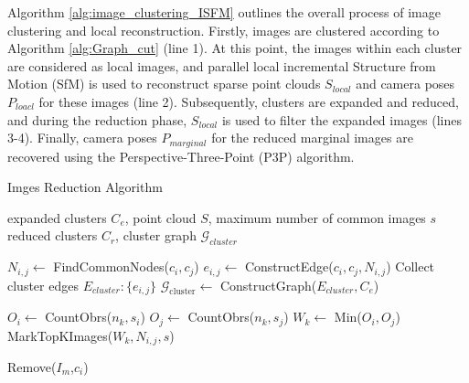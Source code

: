 \documentclass[runningheads]{llncs}
\begin{document}
Algorithm \ref{alg:image_clustering_ISFM} outlines the overall process of image clustering and local reconstruction. Firstly, images are clustered according to Algorithm \ref{alg:Graph_cut} (line 1). At this point, the images within each cluster are considered as local images, and parallel local incremental Structure from Motion (SfM) is used to reconstruct sparse point clouds $S_{local}$ and camera poses $P_{loacl}$ for these images (line 2). Subsequently, clusters are expanded and reduced, and during the reduction phase, $S_{local}$ is used to filter the expanded images (lines 3-4). Finally, camera poses $P_{ marginal}$ for the reduced marginal images are recovered using the Perspective-Three-Point (P3P) algorithm.
\begin{algorithm}
\caption{Imges Reduction Algorithm}
\label{alg:Reduction}
\begin{algorithmic}[1]
\Require expanded clusters $C_e$, point cloud $S$, maximum number of common images $s$
\Ensure reduced clusters $C_r$, cluster graph $\mathcal{G}_{cluster}$

   \State $N_{i,j} \gets$ FindCommonNodes($c_i,c_j$)  
   \State $e_{i,j} \gets$ ConstructEdge($c_i,c_j,N_{i,j}$)  
   \State Collect cluster edges $E_{cluster}:\{e_{i,j}\}$   
\EndFor		
\State $\mathcal{G}_{\text{cluster}}  \gets$ ConstructGraph($E_{cluster},C_e$)    

        \State $O_i \gets$ CountObrs($n_{k},s_i$)      
        \State $O_j \gets$ CountObrs($n_{k},s_j$)      
        \State $W_{k} \gets$ Min($O_i,O_j $)           
        \State MarkTopKImages($W_{k},N_{i,j},s$)
    \EndFor		
\EndFor		

        \State Remove($I_m$,$c_i$)
    \EndIf    
\EndFor		
\end{algorithmic}
\end{algorithm}
\end{document}
